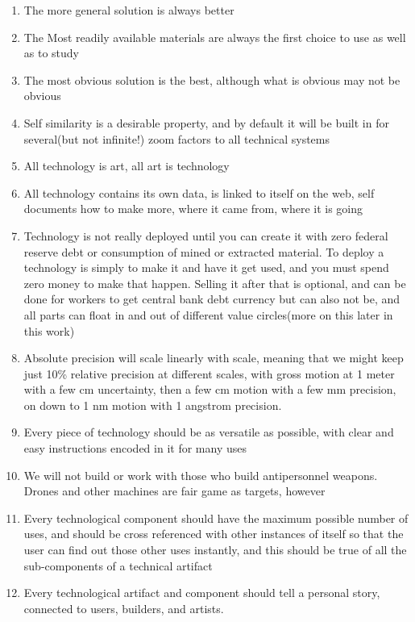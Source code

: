 \begin{enumerate}
\def\labelenumi{\arabic{enumi}.}
\tightlist
\item
  The more general solution is always better
\item
  The Most readily available materials are always the first choice to
  use as well as to study
\item
  The most obvious solution is the best, although what is obvious may
  not be obvious
\item
  Self similarity is a desirable property, and by default it will be
  built in for several(but not infinite!) zoom factors to all technical
  systems
\item
  All technology is art, all art is technology
\item
  All technology contains its own data, is linked to itself on the web,
  self documents how to make more, where it came from, where it is going
\item
  Technology is not really deployed until you can create it with zero
  federal reserve debt or consumption of mined or extracted material. To
  deploy a technology is simply to make it and have it get used, and you
  must spend zero money to make that happen. Selling it after that is
  optional, and can be done for workers to get central bank debt
  currency but can also not be, and all parts can float in and out of
  different value circles(more on this later in this work)
\item
  Absolute precision will scale linearly with scale, meaning that we
  might keep just 10\% relative precision at different scales, with
  gross motion at 1 meter with a few cm uncertainty, then a few cm
  motion with a few mm precision, on down to 1 nm motion with 1 angstrom
  precision.\\
\item
  Every piece of technology should be as versatile as possible, with
  clear and easy instructions encoded in it for many uses
\item
  We will not build or work with those who build antipersonnel weapons.
  Drones and other machines are fair game as targets, however
\item
  Every technological component should have the maximum possible number
  of uses, and should be cross referenced with other instances of itself
  so that the user can find out those other uses instantly, and this
  should be true of all the sub-components of a technical artifact
\item
  Every technological artifact and component should tell a personal
  story, connected to users, builders, and artists.
\end{enumerate}
